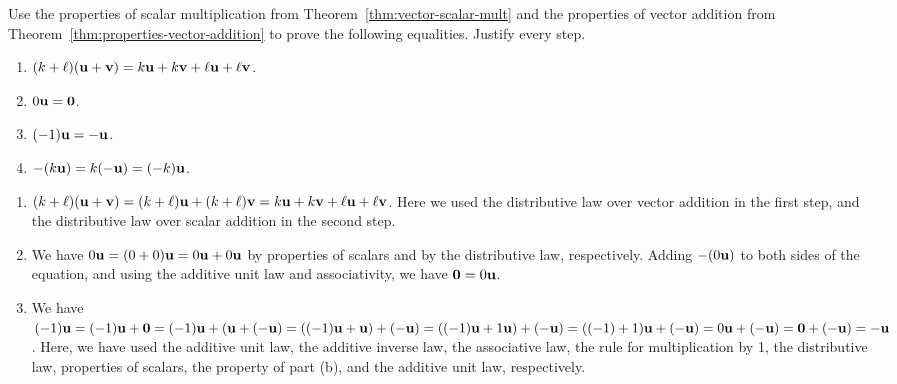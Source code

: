 \begin{enumialphparenastyle}
\begin{ex}
  Use the properties of scalar multiplication from
  Theorem~\ref{thm:vector-scalar-mult} and the properties of vector
  addition from Theorem~\ref{thm:properties-vector-addition} to prove
  the following equalities. Justify every step.
  \begin{enumerate}
  \item $(k+\ell)(\mbox{\bf u}+\mbox{\bf v}) = k\mbox{\bf u} + k\mbox{\bf v} +
    \ell\mbox{\bf u} + \ell\mbox{\bf v}$.
  \item $0\mbox{\bf u} = \mbox{\bf 0}$.
  \item $(-1)\mbox{\bf u} = -\mbox{\bf u}$.
  \item $-(k\mbox{\bf u}) = k(-\mbox{\bf u}) = (-k)\mbox{\bf u}$.
  \end{enumerate}
  \begin{sol}
    \begin{enumerate}
    \item
      $(k+\ell)(\mbox{\bf u}+\mbox{\bf v}) = (k+\ell)\mbox{\bf u} +
      (k+\ell)\mbox{\bf v} = k\mbox{\bf u} + k\mbox{\bf v} + \ell\mbox{\bf u} +
      \ell\mbox{\bf v}$. Here we used the distributive law over vector
      addition in the first step, and the distributive law over scalar
      addition in the second step.
    \item We have $0\mbox{\bf u} = (0+0)\mbox{\bf u} = 0\mbox{\bf u} + 0\mbox{\bf u}$
      by properties of scalars and by the distributive law,
      respectively. Adding $-(0\mbox{\bf u})$ to both sides of the
      equation, and using the additive unit law and associativity, we
      have $\mbox{\bf 0} = 0\mbox{\bf u}$.
    \item We have $(-1)\mbox{\bf u} = (-1)\mbox{\bf u} + \mbox{\bf 0} =
      (-1)\mbox{\bf u} + (\mbox{\bf u} + (-\mbox{\bf u}) = ((-1)\mbox{\bf u} +
      \mbox{\bf u}) + (-\mbox{\bf u}) = ((-1)\mbox{\bf u} + 1\mbox{\bf u}) +
      (-\mbox{\bf u}) = ((-1)+1)\mbox{\bf u} + (-\mbox{\bf u}) = 0\mbox{\bf u} +
      (-\mbox{\bf u}) = \mbox{\bf 0} + (-\mbox{\bf u}) = -\mbox{\bf u}$. Here, we have
      used the additive unit law, the additive inverse law, the
      associative law, the rule for multiplication by 1, the
      distributive law, properties of scalars, the property of part
      (b), and the additive unit law, respectively.
    \end{enumerate}
  \end{sol}
\end{ex}


\end{enumialphparenastyle}
